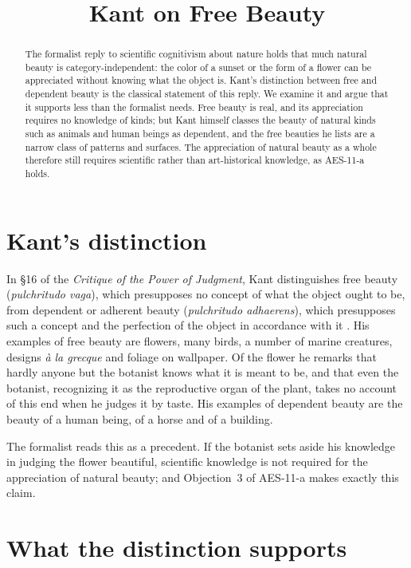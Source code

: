 \documentclass{situationist-preprint}
\title{Kant on Free Beauty}
\begin{document}
\maketitle

\begin{abstract}
The formalist reply to scientific cognitivism about nature holds that much natural beauty is category-independent: the color of a sunset or the form of a flower can be appreciated without knowing what the object is. Kant's distinction between free and dependent beauty is the classical statement of this reply. We examine it and argue that it supports less than the formalist needs. Free beauty is real, and its appreciation requires no knowledge of kinds; but Kant himself classes the beauty of natural kinds such as animals and human beings as dependent, and the free beauties he lists are a narrow class of patterns and surfaces. The appreciation of natural beauty as a whole therefore still requires scientific rather than art-historical knowledge, as AES-11-a holds.
\end{abstract}

\section{Kant's distinction}

In §16 of the \emph{Critique of the Power of Judgment}, Kant distinguishes free beauty (\emph{pulchritudo vaga}), which presupposes no concept of what the object ought to be, from dependent or adherent beauty (\emph{pulchritudo adhaerens}), which presupposes such a concept and the perfection of the object in accordance with it \citep[§16]{Kant1790}. His examples of free beauty are flowers, many birds, a number of marine creatures, designs \emph{\`a la grecque} and foliage on wallpaper. Of the flower he remarks that hardly anyone but the botanist knows what it is meant to be, and that even the botanist, recognizing it as the reproductive organ of the plant, takes no account of this end when he judges it by taste. His examples of dependent beauty are the beauty of a human being, of a horse and of a building.

The formalist reads this as a precedent. If the botanist sets aside his knowledge in judging the flower beautiful, scientific knowledge is not required for the appreciation of natural beauty; and Objection~3 of AES-11-a makes exactly this claim.

\section{What the distinction supports}
\end{document}
